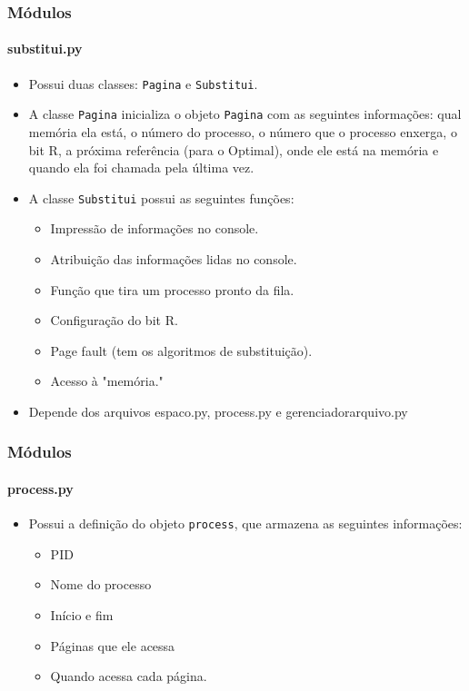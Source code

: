 \documentclass{beamer}
\begin{document}
\begin{frame}
	\frametitle{Módulos}
	\framesubtitle{substitui.py}
	\begin{itemize}
		\item Possui duas classes: \texttt{Pagina} e \texttt{Substitui}.
		\item A classe \texttt{Pagina} inicializa o objeto \texttt{Pagina} com as seguintes informações: qual memória ela está, o número do processo, o número que o processo enxerga, o bit R, a próxima referência (para o Optimal), onde ele está na memória e quando ela foi chamada pela última vez.
		\item A classe \texttt{Substitui} possui as seguintes funções:
		\begin{itemize}
			\item Impressão de informações no console.
			\item Atribuição das informações lidas no console.
			\item Função que tira um processo pronto da fila.
			\item Configuração do bit R.
			\item Page fault (tem os algoritmos de substituição).
			\item Acesso à "memória."
		\end{itemize}
		\item Depende dos arquivos espaco.py, process.py e gerenciador\textunderscore arquivo.py
	\end{itemize}
\end{frame}

\begin{frame}
	\frametitle{Módulos}
	\framesubtitle{process.py}
	\begin{itemize}
		\item Possui a definição do objeto \texttt{process}, que armazena as seguintes informações:
		\begin{itemize}
			\item PID
			\item Nome do processo
			\item Início e fim
			\item Páginas que ele acessa
			\item Quando acessa cada página.
		\end{itemize}
	\end{itemize}
\end{frame}
\end{document}
